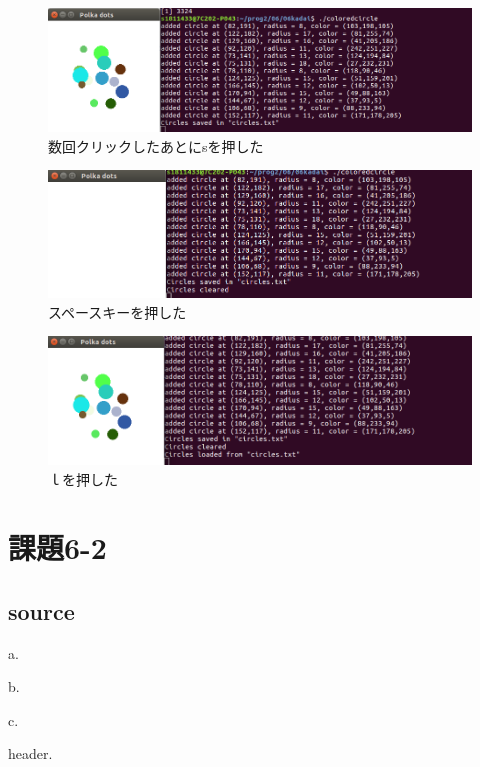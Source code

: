 \documentclass[10pt,a4paper]{jsarticle}
\begin{document}
\begin{figure}[h]
  \includegraphics[width=0.8\linewidth]{b.png}
  \caption{数回クリックしたあとにsを押した}
  \label{fig:sutehage}

\end{figure}
\newpage
\begin{figure}[h]
  \includegraphics[width=0.8\linewidth]{c.png}
  \caption{スペースキーを押した}
  \label{fig:sutehage}

\end{figure}
\begin{figure}[h]
  \includegraphics[width=0.8\linewidth]{d.png}
  \caption{ｌを押した}
  \label{fig:sutehage}

\end{figure}

\newpage

\section{課題6-2}
\subsection{source}
a.

b.

c.

header.

\end{document}
